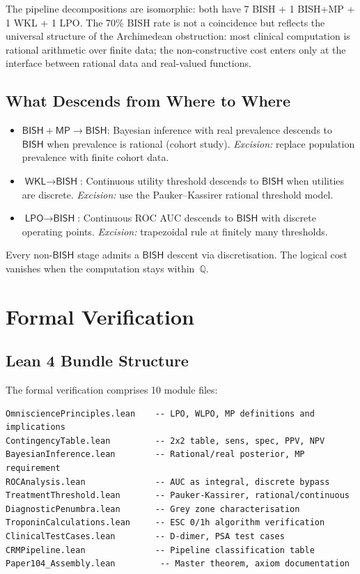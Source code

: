 \documentclass[11pt,a4paper]{article}
\theoremstyle{plain}
\theoremstyle{definition}
\newcommand{\BISH}{\textsf{BISH}}
\newcommand{\WKL}{\textsf{WKL}}
\newcommand{\LPO}{\textsf{LPO}}
\newcommand{\MP}{\textsf{MP}}
\newcommand{\Q}{\mathbb{Q}}
\begin{document}
The pipeline decompositions are isomorphic: both have 7 BISH + 1 BISH+MP + 1 WKL + 1 LPO.  The 70\% BISH rate is not a coincidence but reflects the universal structure of the Archimedean obstruction: most clinical computation is rational arithmetic over finite data; the non-constructive cost enters only at the interface between rational data and real-valued functions.

\subsection{What Descends from Where to Where}

\begin{itemize}[nosep]
\item $\BISH + \MP \to \BISH$: Bayesian inference with real prevalence descends to $\BISH$ when prevalence is rational (cohort study). \emph{Excision:} replace population prevalence with finite cohort data.
\item $\WKL \to \BISH$: Continuous utility threshold descends to $\BISH$ when utilities are discrete. \emph{Excision:} use the Pauker--Kassirer rational threshold model.
\item $\LPO \to \BISH$: Continuous ROC AUC descends to $\BISH$ with discrete operating points. \emph{Excision:} trapezoidal rule at finitely many thresholds.
\end{itemize}

Every non-$\BISH$ stage admits a $\BISH$ descent via discretisation.  The logical cost vanishes when the computation stays within~$\Q$.

\section{Formal Verification}\label{sec:lean}

\subsection{Lean 4 Bundle Structure}

The formal verification comprises 10 module files:

\begin{tcolorbox}[leanbox={P104\_DiagnosticTesting/ — Module Structure}]
\begin{lstlisting}
OmnisciencePrinciples.lean    -- LPO, WLPO, MP definitions and implications
ContingencyTable.lean         -- 2x2 table, sens, spec, PPV, NPV
BayesianInference.lean        -- Rational/real posterior, MP requirement
ROCAnalysis.lean              -- AUC as integral, discrete bypass
TreatmentThreshold.lean       -- Pauker-Kassirer, rational/continuous
DiagnosticPenumbra.lean       -- Grey zone characterisation
TroponinCalculations.lean     -- ESC 0/1h algorithm verification
ClinicalTestCases.lean        -- D-dimer, PSA test cases
CRMPipeline.lean              -- Pipeline classification table
Paper104_Assembly.lean         -- Master theorem, axiom documentation
\end{lstlisting}
\end{tcolorbox}
\end{document}

